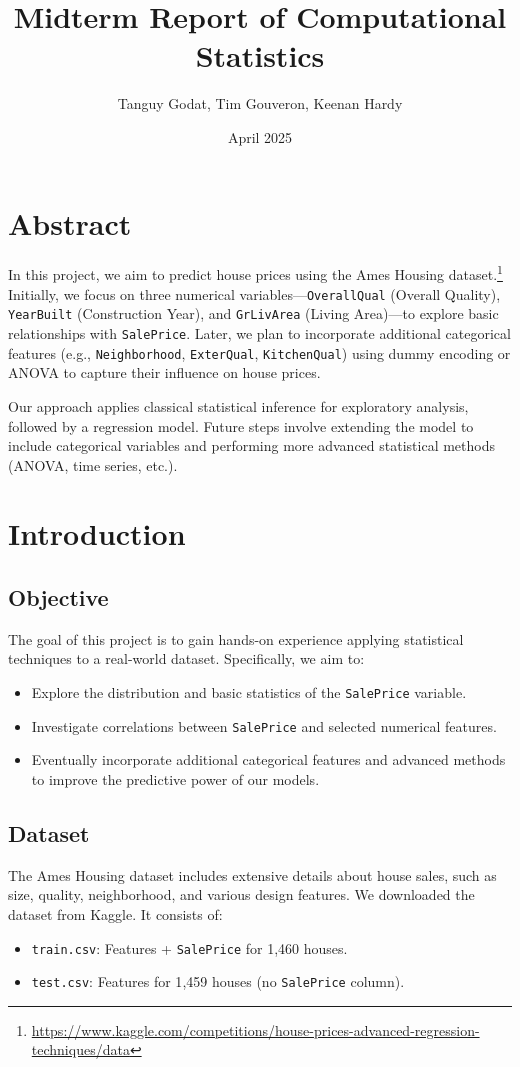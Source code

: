 \documentclass{article}
\title{Midterm Report of Computational Statistics}
\author{Tanguy Godat, Tim Gouveron, Keenan Hardy}
\date{April 2025}
\begin{document}
\maketitle

\section{Abstract}
In this project, we aim to predict house prices using the Ames Housing dataset.\footnote{\url{https://www.kaggle.com/competitions/house-prices-advanced-regression-techniques/data}} 
Initially, we focus on three numerical variables---\texttt{OverallQual} (Overall Quality), \texttt{YearBuilt} (Construction Year), and \texttt{GrLivArea} (Living Area)---to explore basic relationships with \texttt{SalePrice}. Later, we plan to incorporate additional categorical features (e.g., \texttt{Neighborhood}, \texttt{ExterQual}, \texttt{KitchenQual}) using dummy encoding or ANOVA to capture their influence on house prices.  

Our approach applies classical statistical inference for exploratory analysis, followed by a regression model. Future steps involve extending the model to include categorical variables and performing more advanced statistical methods (ANOVA, time series, etc.).

\section{Introduction}

\subsection{Objective}
The goal of this project is to gain hands-on experience applying statistical techniques to a real-world dataset. Specifically, we aim to:
\begin{itemize}
    \item Explore the distribution and basic statistics of the \texttt{SalePrice} variable.
    \item Investigate correlations between \texttt{SalePrice} and selected numerical features.
    \item Eventually incorporate additional categorical features and advanced methods to improve the predictive power of our models.
\end{itemize}

\subsection{Dataset}
The Ames Housing dataset includes extensive details about house sales, such as size, quality, neighborhood, and various design features. We downloaded the dataset from Kaggle. It consists of:
\begin{itemize}
    \item \texttt{train.csv}: Features + \texttt{SalePrice} for 1{,}460 houses.
    \item \texttt{test.csv}: Features for 1{,}459 houses (no \texttt{SalePrice} column).
\end{itemize}
\end{document}
